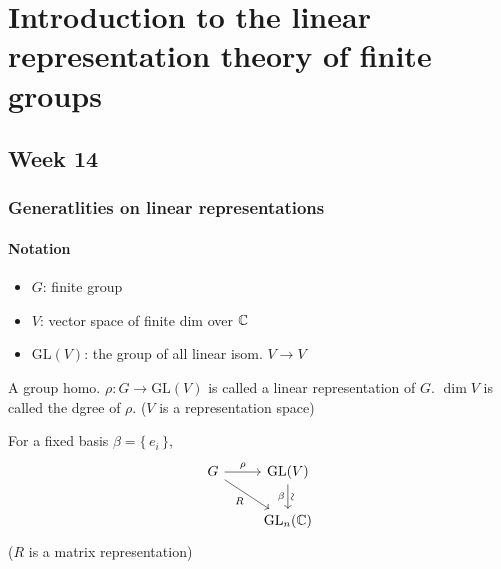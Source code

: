 \section{Introduction to the linear representation theory of finite groups}
\subsection{Week 14}
\subsubsection{Generatlities on linear representations}
\paragraph{Notation}

\begin{itemize}
  \item $G$: finite group
  \item $V$: vector space of finite dim over $\mathbb{C}$
  \item $\text{GL}(V)$: the group of all linear isom. $V \to V$
\end{itemize}

\begin{definition}
  A group homo. $\rho: G \to \text{GL}(V)$ is called a linear representation
  of $G$.
  $\dim V$ is called the dgree of $\rho$.
  ($V$ is a representation space)

  For a fixed basis $\beta = \{\, e_i \,\}$,
  \[
    \begin{tikzcd}
      G \arrow{r}{\rho} \arrow[swap]{dr}{R} & \text{GL}(V) \arrow[d, "\beta"', "\rotatebox{90}{\(\sim\)}"] \\
                                            & \text{GL}_n(\Cb)
    \end{tikzcd}
  \]
  ($R$ is a matrix representation)
\end{definition}

